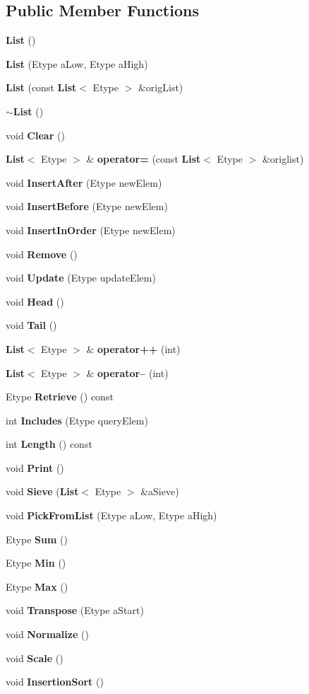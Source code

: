 \subsection*{Public Member Functions}
\begin{CompactItemize}
\item 
{\bf List} ()
\item 
{\bf List} (Etype a\-Low, Etype a\-High)
\item 
{\bf List} (const  {\bf List}$<$ Etype $>$ \&orig\-List)
\item 
{\bf $\sim$List} ()
\item 
void {\bf Clear} ()
\item 
{\bf List}$<$ Etype $>$ \& {\bf operator=} (const  {\bf List}$<$ Etype $>$ \&origlist)
\item 
void {\bf Insert\-After} (Etype new\-Elem)
\item 
void {\bf Insert\-Before} (Etype new\-Elem)
\item 
void {\bf Insert\-In\-Order} (Etype new\-Elem)
\item 
void {\bf Remove} ()
\item 
void {\bf Update} (Etype update\-Elem)
\item 
void {\bf Head} ()
\item 
void {\bf Tail} ()
\item 
{\bf List}$<$ Etype $>$ \& {\bf operator++} (int)
\item 
{\bf List}$<$ Etype $>$ \& {\bf operator--} (int)
\item 
Etype {\bf Retrieve} () const 
\item 
int {\bf Includes} (Etype query\-Elem)
\item 
int {\bf Length} () const 
\item 
void {\bf Print} ()
\item 
void {\bf Sieve} ({\bf List}$<$ Etype $>$ \&a\-Sieve)
\item 
void {\bf Pick\-From\-List} (Etype a\-Low, Etype a\-High)
\item 
Etype {\bf Sum} ()
\item 
Etype {\bf Min} ()
\item 
Etype {\bf Max} ()
\item 
void {\bf Transpose} (Etype a\-Start)
\item 
void {\bf Normalize} ()
\item 
void {\bf Scale} ()
\item 
void {\bf Insertion\-Sort} ()
\end{CompactItemize}
